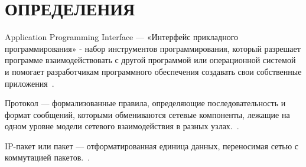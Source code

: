 \section*{\centering ОПРЕДЕЛЕНИЯ}

Application Programming Interface --- «Интерфейс прикладного программирования» - набор инструментов программирования, который разрешает программе взаимодействовать с другой программой или операционной системой и помогает разработчикам программного обеспечения создавать свои собственные приложения~\cite{api}.

Протокол --- формализованные правила, определяющие последовательность и формат сообщений, которыми обмениваются сетевые компоненты, лежащие на одном уровне модели сетевого взаимодействия в разных узлах.~\cite{tcpip_lora}.

IP-пакет или пакет --- отформатированная единица данных, переносимая сетью с коммутацией пакетов.~\cite{tcpip_lora}.

